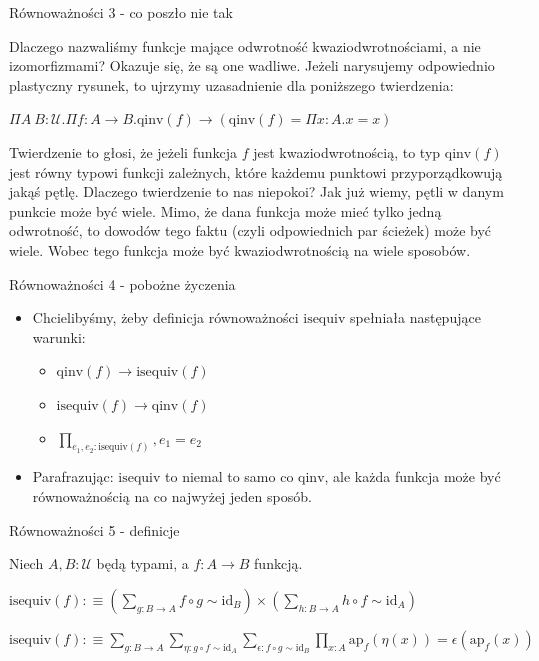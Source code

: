 \documentclass{beamer}
\newcommand{\defn}{:\equiv}
\newcommand{\U}{\mathcal{U}}
\newcommand{\id}{\text{id}}
\newcommand{\comp}{\circ}
\newcommand{\ap}[2]{\text{ap}_{#1}(#2)}
\newcommand{\qinv}{\text{qinv}}
\newcommand{\isequiv}{\text{isequiv}}
\begin{document}
\begin{frame}{Równoważności 3 - co poszło nie tak}

Dlaczego nazwaliśmy funkcje mające odwrotność kwaziodwrotnościami, a nie izomorfizmami? Okazuje się, że są one wadliwe. Jeżeli narysujemy odpowiednio plastyczny rysunek, to ujrzymy uzasadnienie dla poniższego twierdzenia:

\begin{theorem}

$\Pi A\ B : \U. \Pi f : A \to B. \qinv(f) \to (\qinv(f) = \Pi x : A. x = x)$

\end{theorem}

Twierdzenie to głosi, że jeżeli funkcja $f$ jest kwaziodwrotnością, to typ $\qinv(f)$ jest równy typowi funkcji zależnych, które każdemu punktowi przyporządkowują jakąś pętlę. Dlaczego twierdzenie to nas niepokoi? Jak już wiemy, pętli w danym punkcie może być wiele. Mimo, że dana funkcja może mieć tylko jedną odwrotność, to dowodów tego faktu (czyli odpowiednich par ścieżek) może być wiele. Wobec tego funkcja może być kwaziodwrotnością na wiele sposobów.

\end{frame}

\begin{frame}{Równoważności 4 - pobożne życzenia}
\begin{itemize}
	\item Chcielibyśmy, żeby definicja równoważności $\isequiv$ spełniała następujące warunki:
	\begin{itemize}
		\item $\qinv(f) \to \isequiv(f)$
		\item $\isequiv(f) \to \qinv(f)$
		\item $\prod_{e_1, e_2 : \isequiv(f)}, e_1 = e_2$
	\end{itemize}
	\item Parafrazując: $\isequiv$ to niemal to samo co $\qinv$, ale każda funkcja może być równoważnością na co najwyżej jeden sposób.
\end{itemize}
\end{frame}

\begin{frame}{Równoważności 5 - definicje}

Niech $A, B : \U$ będą typami, a $f : A \to B$ funkcją.

\begin{definition}[Równoważność 1]
$
\displaystyle
	\isequiv(f) \defn
		\left(\sum_{g : B \to A} f \comp g \sim \id_B\right) \times
		\left(\sum_{h : B \to A} h \comp f \sim \id_A\right)
$
\end{definition}

\begin{definition}[Równoważność 2]
$
\displaystyle
	\isequiv(f) \defn
		\sum_{g : B \to A} \sum_{\eta : g \comp f \sim \id_A} \sum_{\epsilon : f \comp g \sim \id_B}
			\prod_{x : A} \ap{f}{\eta(x)} = \epsilon(\ap{f}{x})
$
\end{definition}

\end{frame}
\end{document}
